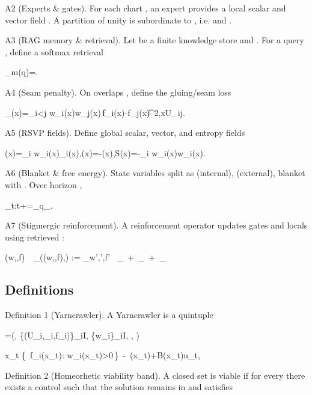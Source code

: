 \documentclass{article}
\begin{document}
A2 (Experts \& gates).
For each chart , an expert provides a  local scalar  and vector field . A  partition of unity  is subordinate to , i.e.  and .

A3 (RAG memory \& retrieval).
Let  be a finite knowledge store and . For a query , define a softmax retrieval

\omega_m(q)=.

A4 (Seam penalty).
On overlaps , define the gluing/seam loss

_{}(x)=\sum_{i<j} w_i(x)w_j(x)\,\big\|f_i(x)-f_j(x)\big\|^2,\qquad x\in U_{ij}.

A5 (RSVP fields).
Define global scalar, vector, and entropy fields

\Phi(x)=\sum_i w_i(x)\phi_i(x),\qquad {}(x)=-\nabla \Phi(x),\qquad S(x)=-\sum_i w_i(x)\log w_i(x).

A6 (Blanket \& free energy).
State variables split as  (internal),  (external), blanket  with . Over horizon ,

_{t:t+\Delta}=_{q_\phi}\!.

A7 (Stigmergic reinforcement).
A reinforcement operator  updates gates  and locals  using retrieved :

(w,\phi,f)\ \mapsto\ _{\eta}\big((w,\phi,f),\xi\big)
:= \arg\min_{w',\phi',f'} \ _{}\ +\ \lambda {}_{}\ +\ \alpha {}_{}

\subsection{Definitions}

Definition 1 (Yarncrawler).
A Yarncrawler is a quintuple

=\big(, \{(U_i,\phi_i,f_i)\}_{i\in I}, \{w_i\}_{i\in I}, , \big)

\dot x_t \in {}\{\, f_i(x_t): w_i(x_t)>0\,\}\ -\ \nabla \Phi(x_t)+B(x_t)u_t,

Definition 2 (Homeorhetic viability band).
A closed set  is viable if for every  there exists a control  such that the solution remains in  and satisfies
\end{document}
